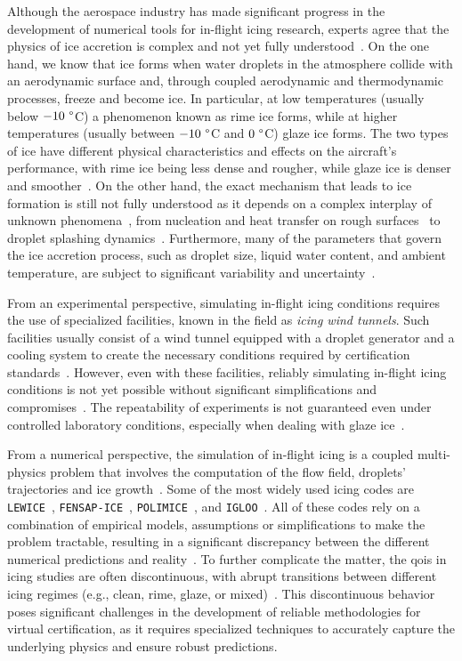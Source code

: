 \smallskip
Although the aerospace industry has made significant progress in the development of numerical tools for in-flight icing research, experts agree that the physics of ice accretion is complex and not yet fully understood~\cite{Guardone2025-ba}. On the one hand, we know that ice forms when water droplets in the atmosphere collide with an aerodynamic surface and, through coupled aerodynamic and thermodynamic processes, freeze and become ice. In particular, at low temperatures (usually below $-10\ \degree$C) a phenomenon known as rime ice forms, while at higher temperatures (usually between $-10\ \degree$C and $0\ \degree$C) glaze ice forms. The two types of ice have different physical characteristics and effects on the aircraft's performance, with rime ice being less dense and rougher, while glaze ice is denser and smoother~\cite{Gent2000, Caccia2023}. On the other hand, the exact mechanism that leads to ice formation is still not fully understood as it depends on a complex interplay of unknown phenomena~\cite{jacobi2019collection}, from nucleation and heat transfer on rough surfaces~\cite{Tarquini2014, kamal_2} to droplet splashing dynamics~\cite{kamal}. Furthermore, many of the parameters that govern the ice accretion process, such as droplet size, liquid water content, and ambient temperature, are subject to significant variability and uncertainty~\cite{Bellosta2021, Gori2022}. 

\smallskip
From an experimental perspective, simulating in-flight icing conditions requires the use of specialized facilities, known in the field as \textit{icing wind tunnels}. Such facilities usually consist of a wind tunnel equipped with a droplet generator and a cooling system to create the necessary conditions required by certification standards~\cite{ciraiwt, papadakis2003experimental}. However, even with these facilities, reliably simulating in-flight icing conditions is not yet possible without significant simplifications and compromises~\cite{kind1998}. The repeatability of experiments is not guaranteed even under controlled laboratory conditions, especially when dealing with glaze ice~\cite{nasa_repeatability}. 

\smallskip
From a numerical perspective, the simulation of in-flight icing is a coupled multi-physics problem that involves the computation of the flow field, droplets' trajectories and ice growth~\cite{Gori2022}. Some of the most widely used icing codes are \texttt{LEWICE}~\cite{lewice}, \texttt{FENSAP-ICE}~\cite{fensap}, \texttt{POLIMICE}~\cite{polimice}, and \texttt{IGLOO}~\cite{igloo}. All of these codes rely on a combination of empirical models, assumptions or simplifications to make the problem tractable, resulting in a significant discrepancy between the different numerical predictions and reality~\cite{many_ice_shapes, Li2023}. To further complicate the matter, the \glspl{qoi} in icing studies are often discontinuous, with abrupt transitions between different icing regimes (e.g., clean, rime, glaze, or mixed)~\cite{Gori2022, GoriGallia2024}. This discontinuous behavior poses significant challenges in the development of reliable methodologies for virtual certification, as it requires specialized techniques to accurately capture the underlying physics and ensure robust predictions.


